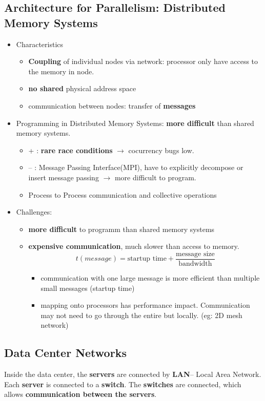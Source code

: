 \subsection{Architecture for Parallelism: Distributed Memory Systems}
\begin{itemize}
	\item Characteristics
	\begin{itemize}
		\item \textbf{Coupling} of individual nodes via network: processor only have access to the memory in node.
		\item \textbf{no shared} physical address space
		\item communication between nodes: transfer of \textbf{messages}
	\end{itemize}
	\item Programming in Distributed Memory Systems: \textbf{more difficult} than shared memory systems.
	\begin{itemize}
		\item + : \textbf{rare race conditions} $\rightarrow$ cocurrency bugs low.
		\item -- : Message Passing Interface(MPI), have to explicitly decompose or insert message passing $\rightarrow$ more difficult to program.
		\item Process to Process communication and collective operations
	\end{itemize}
	\item Challenges: 
	\begin{itemize}
		\item \textbf{more difficult} to programm than shared memory systems
		\item \textbf{expensive communication}, much slower than access to memory.
		$$t(message) = \text{startup time} + \frac{\text{message size}}{\text{bandwidth}}$$
		\begin{itemize}
			\item communication with one large message is more efficient than multiple small messages (startup time)
			\item mapping onto processors has performance impact. Communication may not need to go through the entire but locally. (eg: 2D mesh network)
		\end{itemize}
	\end{itemize}
\end{itemize}

\subsection{Data Center Networks}
Inside the data center, the \textbf{servers} are connected by \textbf{LAN}-- Local Area Network. Each \textbf{server} is connected to a \textbf{switch}. The \textbf{switches} are connected, which allows \textbf{communication between the servers}. \\ \ \\

